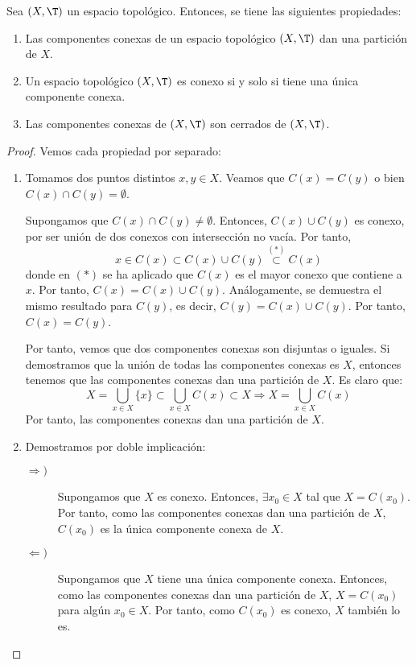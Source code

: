 \begin{prop}
    Sea $(X,\T)$ un espacio topológico. Entonces, se tiene las siguientes propiedades:
    \begin{enumerate}
        \item Las componentes conexas de un espacio topológico $(X,\T)$ dan una partición de $X$.
        \item Un espacio topológico $(X,\T)$ es conexo si y solo si tiene una única componente conexa.
        \item Las componentes conexas de $(X,\T)$ son cerrados de $(X,\T)$.
    \end{enumerate}
\end{prop}
\begin{proof} Vemos cada propiedad por separado:
    \begin{enumerate}
        \item Tomamos dos puntos distintos $x,y\in X$. Veamos que $C(x)=C(y)$ o bien $C(x)\cap C(y)=\emptyset$.

        Supongamos que $C(x)\cap C(y)\neq \emptyset$. Entonces, $C(x)\cup C(y)$ es conexo, por ser unión de dos conexos con intersección no vacía. Por tanto,
        \begin{equation*}
            x\in C(x)\subset C(x)\cup C(y) \stackrel{(\ast)}{\subset} C(x)
        \end{equation*}
        donde en $(\ast)$ se ha aplicado que $C(x)$ es el mayor conexo que contiene a $x$. Por tanto, $C(x)=C(x)\cup C(y)$. Análogamente, se demuestra el mismo resultado para $C(y)$, es decir, $C(y)=C(x)\cup C(y)$. Por tanto, $C(x)=C(y)$.
        
        Por tanto, vemos que dos componentes conexas son disjuntas o iguales. Si demostramos que la unión de todas las componentes conexas es $X$, entonces tenemos que las componentes conexas dan una partición de $X$.
        Es claro que:
        \begin{equation*}
            X=\bigcup_{x\in X}\{x\} \subset \bigcup_{x\in X}C(x)\subset X \Longrightarrow X=\bigcup_{x\in X}C(x)
        \end{equation*}
        Por tanto, las componentes conexas dan una partición de $X$.

        \item Demostramos por doble implicación:
        \begin{description}
            \item[$\Longrightarrow)$] Supongamos que $X$ es conexo. Entonces, $\exists x_0\in X$ tal que $X=C(x_0)$. Por tanto, como las componentes conexas dan una partición de $X$, $C(x_0)$ es la única componente conexa de $X$.
            \item[$\Longleftarrow)$] Supongamos que $X$ tiene una única componente conexa. Entonces, como las componentes conexas dan una partición de $X$, $X=C(x_0)$ para algún $x_0\in X$. Por tanto, como $C(x_0)$ es conexo, $X$ también lo es.
        \end{description}


\end{enumerate}
\end{proof}
